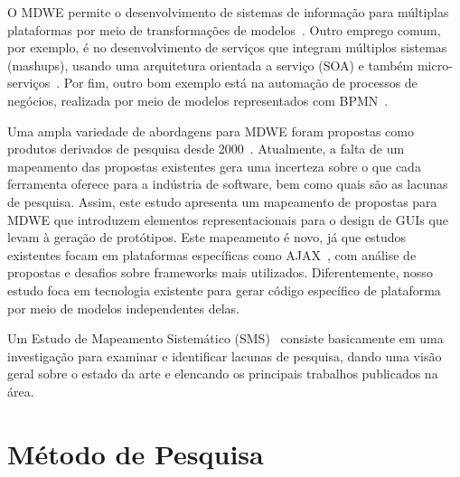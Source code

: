O MDWE permite o desenvolvimento de sistemas de informação para múltiplas plataformas por meio de transformações de modelos~\cite{Vara12}. Outro emprego comum, por exemplo, é no desenvolvimento de serviços que integram múltiplos sistemas (mashups), usando uma arquitetura orientada a serviço (SOA) e também micro-serviços~\cite{DEVRIEZE2011637}. Por fim, outro bom exemplo está na automação de processos de negócios, realizada por meio de modelos representados com BPMN~\cite{Pillat15}. %


Uma ampla variedade de abordagens para MDWE foram propostas como produtos derivados de pesquisa desde 2000~\cite{Ceri00}. Atualmente, a falta de um mapeamento das propostas existentes gera uma incerteza sobre o que cada ferramenta oferece para a indústria de software, bem como quais são as lacunas de pesquisa. Assim, este estudo apresenta um mapeamento de propostas para MDWE que introduzem elementos representacionais para o design de GUIs que levam à geração de protótipos. Este mapeamento é novo, já que estudos existentes focam em plataformas específicas como AJAX~\cite{mesbah2008component}, com análise de propostas e desafios sobre frameworks mais utilizados. Diferentemente, nosso estudo foca em tecnologia existente para gerar código específico de plataforma por meio de modelos independentes delas.

Um Estudo de Mapeamento Sistemático (SMS)~\cite{Kitchenham07} consiste basicamente em uma investigação para examinar e identificar lacunas de pesquisa, dando uma visão geral sobre o estado da arte e elencando os principais trabalhos publicados na área. %


\section{Método de Pesquisa}
\label{sec:method}

